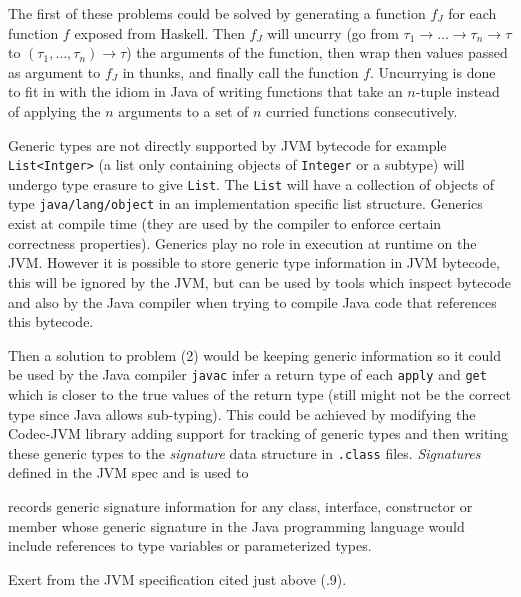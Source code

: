 \documentclass[float=false, crop=false]{standalone}
\begin{document}
The first of these problems could be solved by generating a function $f_J$ for each 
function $f$ exposed from Haskell. Then $f_J$ will uncurry
(go from \mbox{$\tau_1 \rightarrow \dotsc \rightarrow \tau_n \rightarrow \tau$} to
\mbox{$(\tau_1,\dotsc,\tau_n) \rightarrow \tau$}) the arguments of the function, then 
wrap then values passed as argument to $f_J$ in thunks, and finally call the function $f$. 
Uncurrying is done to fit in with the idiom in Java of writing functions that take 
an $n$-tuple instead of applying the $n$ arguments to a set of $n$ curried functions
consecutively. 

Generic types are not directly supported by JVM bytecode for example
\verb|List<Intger>| (a list only containing objects of \verb|Integer| or a subtype)
will undergo type erasure to give \verb|List|. The \verb|List| 
will have a collection of objects of type \verb|java/lang/object| in an implementation
specific list structure. 
Generics exist at compile time (they are used by the compiler to enforce 
certain correctness properties). Generics play no role in execution at runtime
on the JVM. However it is possible to store generic type information
in JVM bytecode, this will be ignored by the JVM, but can be used by tools
which inspect bytecode and also by the Java compiler when trying to compile
Java code that references this bytecode.

Then a solution to problem (2) would be keeping generic information so it 
could be used by the Java compiler \texttt{javac} infer a return type of 
each \texttt{apply} and \texttt{get} which is closer to the true 
values of the return type (still might not be the correct type 
since Java allows sub-typing). 
This could be achieved by modifying the Codec-JVM library 
\cite{codec-jvm-link} adding support for tracking of generic types and then 
writing these generic types to the \textit{signature} data structure in 
\verb|.class| files. \textit{Signatures} defined in the JVM spec
\cite[.9]{jvm-spec8} and is used to 
\begin{displayquote}
  records generic signature information for any class, interface, 
  constructor or member whose generic signature in the Java 
  programming language would include references to type variables 
  or parameterized types.
\end{displayquote}
\begin{flushright}
Exert from the JVM specification cited just above (.9).
\end{flushright}
\end{document}
